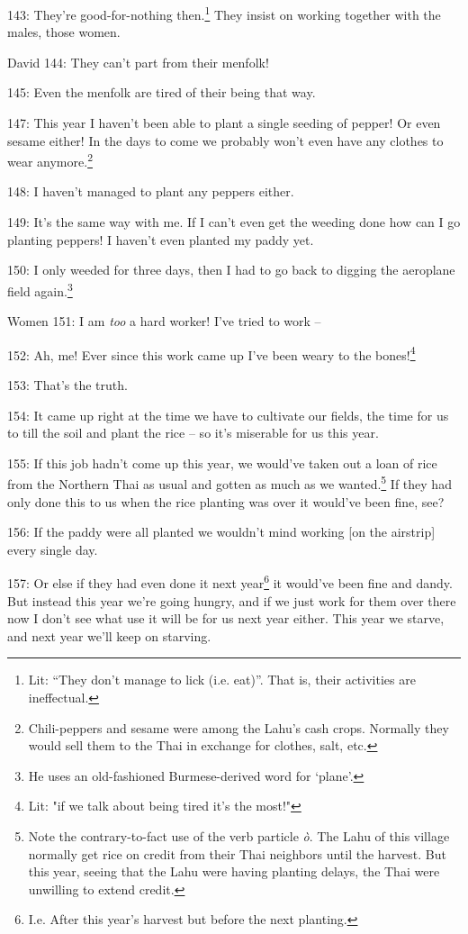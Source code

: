 143: They're good-for-nothing then.\footnote{Lit: ``They don't manage to lick (i.e. eat)''. That is, their activities are ineffectual.} They insist on working together with the
males, those women.

David 144: They can't part from their menfolk!

145: Even the menfolk are tired of their being that way.

147: This year I haven't been able to plant a single seeding of pepper! Or even
sesame either! In the days to come we probably won't even have any clothes to wear
anymore.\footnote{Chili-peppers and sesame were among the Lahu's cash crops. Normally they would sell them to the Thai in exchange for clothes, salt, etc.}

148: I haven't managed to plant any peppers either.

149: It's the same way with me. If I can't even get the weeding done how can I
go planting peppers! I haven't even planted my paddy yet.

150: I only weeded for three days, then I had to go back to digging the aeroplane
field again.\footnote{He uses an old-fashioned Burmese-derived word for `plane'.}

Women 151: I am \textit{too} a hard worker! I've tried to work --

152: Ah, me! Ever since this work came up I've been weary to the bones!\footnote{Lit: "if we talk about being tired it's the most!"}

153: That's the truth.

154: It came up right at the time we have to cultivate our fields, the time for
us to till the soil and plant the rice -- so it's miserable for us this year.

155: If this job hadn't come up this year, we would've taken out a loan of rice
from the Northern Thai as usual and gotten as much as we wanted.\footnote{Note the contrary-to-fact use of the verb particle \textit{ò}. The Lahu of this village normally get rice on credit from their Thai neighbors until the harvest. But this year, seeing that the Lahu were having planting delays, the Thai were unwilling to extend credit.} If they had
only done this to us when the rice planting was over it would've been fine, see?

156: If the paddy were all planted we wouldn't mind working [on the airstrip] every
single day.

157: Or else if they had even done it next year\footnote{I.e. After this year's harvest but before the next planting.} it would've been fine and dandy.
But instead this year we're going hungry, and if we just work for them over there
now I don't see what use it will be for us next year either. This year we starve,
and next year we'll keep on starving.

